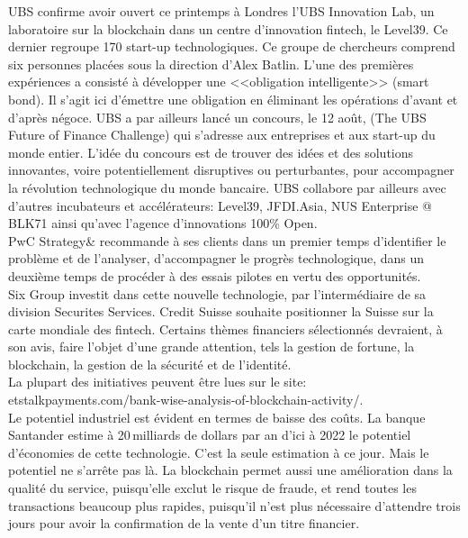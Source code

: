 \documentclass[11pt,twoside,a4paper]{article}
\begin{document}
UBS confirme avoir ouvert ce printemps {\`a} Londres l'UBS Innovation Lab, un laboratoire sur la blockchain dans un centre d'innovation fintech, le Level39. Ce dernier regroupe 170 start-up technologiques. Ce groupe de chercheurs comprend six personnes plac{\'e}es sous la direction d'Alex Batlin. L'une des premi{\`e}res exp{\'e}riences a consist{\'e} {\`a} d{\'e}velopper une <<obligation intelligente>> (smart bond). Il s'agit ici d'{\'e}mettre une obligation en {\'e}liminant les op{\'e}rations d'avant et d'apr{\`e}s n{\'e}goce. UBS a par ailleurs lanc{\'e} un concours, le 12 ao{\^u}t, (The UBS Future of Finance Challenge) qui s'adresse aux entreprises et aux start-up du monde entier. L'id{\'e}e du concours est de trouver des id{\'e}es et des solutions innovantes, voire potentiellement disruptives ou perturbantes, pour accompagner la r{\'e}volution technologique du monde bancaire. UBS collabore par ailleurs avec d'autres incubateurs et acc{\'e}l{\'e}rateurs: Level39, JFDI.Asia, NUS Enterprise @ BLK71 ainsi qu'avec l'agence d'innovations 100\% Open. ~\\

PwC Strategy\& recommande {\`a} ses clients dans un premier temps d'identifier le probl{\`e}me et de l'analyser, d'accompagner le progr{\`e}s technologique, dans un deuxi{\`e}me temps de proc{\'e}der {\`a} des essais pilotes en vertu des opportunit{\'e}s. ~\\
Six Group investit dans cette nouvelle technologie, par l'interm{\'e}diaire de sa division Securites Services. Credit Suisse souhaite positionner la Suisse sur la carte mondiale des fintech. Certains th{\`e}mes financiers s{\'e}lectionn{\'e}s devraient, {\`a} son avis, faire l'objet d'une grande attention, tels la gestion de fortune, la blockchain, la gestion de la s{\'e}curit{\'e} et de l'identit{\'e}. ~\\

La plupart des initiatives peuvent {\^e}tre lues sur le site: etstalkpayments.com/bank-wise-analysis-of-blockchain-activity/. ~\\

Le potentiel industriel est {\'e}vident en termes de baisse des co{\^u}ts. La banque Santander estime {\`a} 20 milliards de dollars par an d'ici {\`a} 2022 le potentiel d'{\'e}conomies de cette technologie. C'est la seule estimation {\`a} ce jour. Mais le potentiel ne s'arr{\^e}te pas l{\`a}. La blockchain permet aussi une am{\'e}lioration dans la qualit{\'e} du service, puisqu'elle exclut le risque de fraude, et rend toutes les transactions beaucoup plus rapides, puisqu'il n'est plus n{\'e}cessaire d'attendre trois jours pour avoir la confirmation de la vente d'un titre financier. ~\\
\end{document}

